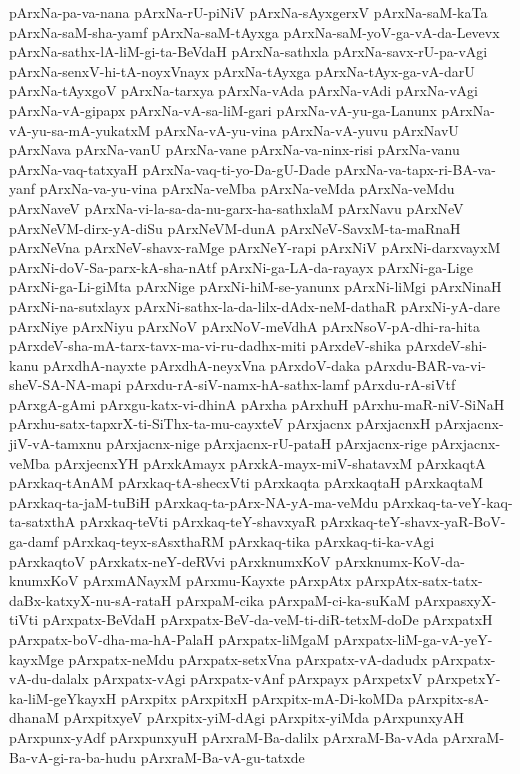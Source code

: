 {pArxNa-pa-va-nana
pArxNa-rU-piNiV
pArxNa-sAyxgerxV
pArxNa-saM-kaTa
pArxNa-saM-sha-yamf
pArxNa-saM-tAyxga
pArxNa-saM-yoV-ga-vA-da-Levevx
pArxNa-sathx-lA-liM-gi-ta-BeVdaH
pArxNa-sathxla
pArxNa-savx-rU-pa-vAgi
pArxNa-senxV-hi-tA-noyxVnayx
pArxNa-tAyxga
pArxNa-tAyx-ga-vA-darU
pArxNa-tAyxgoV
pArxNa-tarxya
pArxNa-vAda
pArxNa-vAdi
pArxNa-vAgi
pArxNa-vA-gipapx
pArxNa-vA-sa-liM-gari
pArxNa-vA-yu-ga-Lanunx
pArxNa-vA-yu-sa-mA-yukatxM
pArxNa-vA-yu-vina
pArxNa-vA-yuvu
pArxNavU
pArxNava
pArxNa-vanU
pArxNa-vane
pArxNa-va-ninx-risi
pArxNa-vanu
pArxNa-vaq-tatxyaH
pArxNa-vaq-ti-yo-Da-gU-Dade
pArxNa-va-tapx-ri-BA-va-yanf
pArxNa-va-yu-vina
pArxNa-veMba
pArxNa-veMda
pArxNa-veMdu
pArxNaveV
pArxNa-vi-la-sa-da-nu-garx-ha-sathxlaM
pArxNavu
pArxNeV
pArxNeVM-dirx-yA-diSu
pArxNeVM-dunA
pArxNeV-SavxM-ta-maRnaH
pArxNeVna
pArxNeV-shavx-raMge
pArxNeY-rapi
pArxNiV
pArxNi-darxvayxM
pArxNi-doV-Sa-parx-kA-sha-nAtf
pArxNi-ga-LA-da-rayayx
pArxNi-ga-Lige
pArxNi-ga-Li-giMta
pArxNige
pArxNi-hiM-se-yanunx
pArxNi-liMgi
pArxNinaH
pArxNi-na-sutxlayx
pArxNi-sathx-la-da-lilx-dAdx-neM-dathaR
pArxNi-yA-dare
pArxNiye
pArxNiyu
pArxNoV
pArxNoV-meVdhA
pArxNsoV-pA-dhi-ra-hita
pArxdeV-sha-mA-tarx-tavx-ma-vi-ru-dadhx-miti
pArxdeV-shika
pArxdeV-shi-kanu
pArxdhA-nayxte
pArxdhA-neyxVna
pArxdoV-daka
pArxdu-BAR-va-vi-sheV-SA-NA-mapi
pArxdu-rA-siV-namx-hA-sathx-lamf
pArxdu-rA-siVtf
pArxgA-gAmi
pArxgu-katx-vi-dhinA
pArxha
pArxhuH
pArxhu-maR-niV-SiNaH
pArxhu-satx-tapxrX-ti-SiThx-ta-mu-cayxteV
pArxjacnx
pArxjacnxH
pArxjacnx-jiV-vA-tamxnu
pArxjacnx-nige
pArxjacnx-rU-pataH
pArxjacnx-rige
pArxjacnx-veMba
pArxjecnxYH
pArxkAmayx
pArxkA-mayx-miV-shatavxM
pArxkaqtA
pArxkaq-tAnAM
pArxkaq-tA-shecxVti
pArxkaqta
pArxkaqtaH
pArxkaqtaM
pArxkaq-ta-jaM-tuBiH
pArxkaq-ta-pArx-NA-yA-ma-veMdu
pArxkaq-ta-veY-kaq-ta-satxthA
pArxkaq-teVti
pArxkaq-teY-shavxyaR
pArxkaq-teY-shavx-yaR-BoV-ga-damf
pArxkaq-teyx-sAsxthaRM
pArxkaq-tika
pArxkaq-ti-ka-vAgi
pArxkaqtoV
pArxkatx-neY-deRVvi
pArxknumxKoV
pArxknumx-KoV-da-knumxKoV
pArxmANayxM
pArxmu-Kayxte
pArxpAtx
pArxpAtx-satx-tatx-daBx-katxyX-nu-sA-rataH
pArxpaM-cika
pArxpaM-ci-ka-suKaM
pArxpasxyX-tiVti
pArxpatx-BeVdaH
pArxpatx-BeV-da-veM-ti-diR-tetxM-doDe
pArxpatxH
pArxpatx-boV-dha-ma-hA-PalaH
pArxpatx-liMgaM
pArxpatx-liM-ga-vA-yeY-kayxMge
pArxpatx-neMdu
pArxpatx-setxVna
pArxpatx-vA-dadudx
pArxpatx-vA-du-dalalx
pArxpatx-vAgi
pArxpatx-vAnf
pArxpayx
pArxpetxV
pArxpetxY-ka-liM-geYkayxH
pArxpitx
pArxpitxH
pArxpitx-mA-Di-koMDa
pArxpitx-sA-dhanaM
pArxpitxyeV
pArxpitx-yiM-dAgi
pArxpitx-yiMda
pArxpunxyAH
pArxpunx-yAdf
pArxpunxyuH
pArxraM-Ba-dalilx
pArxraM-Ba-vAda
pArxraM-Ba-vA-gi-ra-ba-hudu
pArxraM-Ba-vA-gu-tatxde
}
